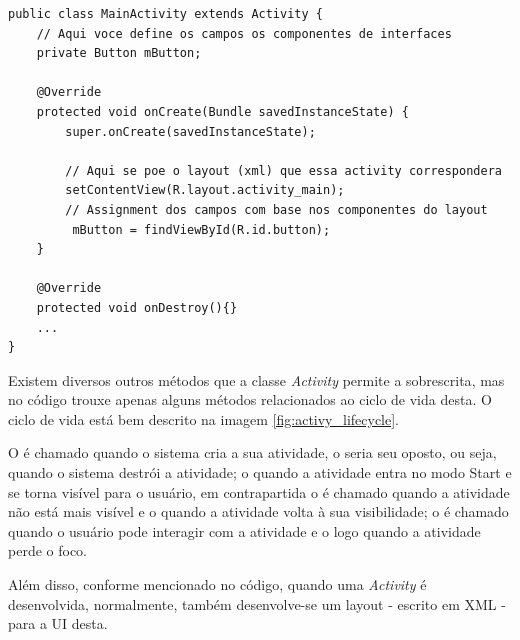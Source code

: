 \documentclass[12pt, a4paper]{article}
\newcommand{\tit}[1]{\textit{#1}}
\begin{document}
        \begin{lstlisting}[style=Java]
public class MainActivity extends Activity {
    // Aqui voce define os campos os componentes de interfaces
    private Button mButton;

    @Override
    protected void onCreate(Bundle savedInstanceState) {
        super.onCreate(savedInstanceState);
        
        // Aqui se poe o layout (xml) que essa activity correspondera
        setContentView(R.layout.activity_main);
        // Assignment dos campos com base nos componentes do layout
         mButton = findViewById(R.id.button);
    }
    
    @Override
    protected void onDestroy(){}
    ...
}
        \end{lstlisting}    
    
        Existem diversos outros métodos que a classe \tit{Activity} permite a sobrescrita\cite{android:activity}, mas no código trouxe apenas alguns métodos relacionados ao ciclo de vida desta. O ciclo de vida está bem descrito na imagem \ref{fig:activy_lifecycle}. 
        
        O  é chamado quando o sistema cria a sua atividade, o  seria seu oposto, ou seja, quando o sistema destrói a atividade; o  quando a atividade entra no modo Start e se torna visível para o usuário, em contrapartida o  é chamado quando a atividade não está mais visível e  o  quando a atividade volta à sua visibilidade; o  é chamado quando o usuário pode interagir com a atividade e o  logo quando a atividade perde o foco.\cite{android:intro-activities, android:activity}
        
        Além disso, conforme mencionado no código, quando uma \tit{Activity} é desenvolvida, normalmente, também desenvolve-se um layout - escrito em XML - para a UI desta. 
    
\end{document}
